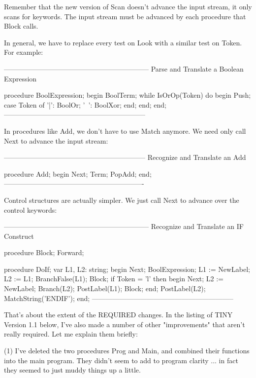 \documentclass[float=false, crop=false]{standalone}
\begin{document}
Remember that the new version of Scan doesn't advance the input stream, it only
scans for keywords. The input stream must be advanced by each procedure that
Block calls.

In general, we have to replace every test on Look with a similar test on Token.
For example:

\begin{code}
{---------------------------------------------------------------}
{ Parse and Translate a Boolean Expression }

procedure BoolExpression;
begin
   BoolTerm;
   while IsOrOp(Token) do begin
      Push;
      case Token of
       '|': BoolOr;
       '~': BoolXor;
      end;
   end;
end;
{--------------------------------------------------------------}
\end{code}

In procedures like Add, we don't have to use Match anymore. We need only call
Next to advance the input stream:

\begin{code}
{--------------------------------------------------------------}
{ Recognize and Translate an Add }

procedure Add;
begin
   Next;
   Term;
   PopAdd;
end;
{-------------------------------------------------------------}
\end{code}

Control structures are actually simpler. We just call Next to advance over the
control keywords:

\begin{code}
{---------------------------------------------------------------}
{ Recognize and Translate an IF Construct }

procedure Block; Forward;

procedure DoIf;
var L1, L2: string;
begin
   Next;
   BoolExpression;
   L1 := NewLabel;
   L2 := L1;
   BranchFalse(L1);
   Block;
   if Token = 'l' then begin
      Next;
      L2 := NewLabel;
      Branch(L2);
      PostLabel(L1);
      Block;
   end;
   PostLabel(L2);
   MatchString('ENDIF');
end;
{--------------------------------------------------------------}
\end{code}

That's about the extent of the REQUIRED changes. In the listing of TINY Version
1.1 below, I've also made a number of other "improvements" that aren't really
required. Let me explain them briefly:

 (1)  I've deleted the two procedures Prog and Main, and combined
      their functions into the main program.  They didn't seem to
      add  to program clarity ... in fact  they  seemed  to  just
      muddy things up a little.
\end{document}
